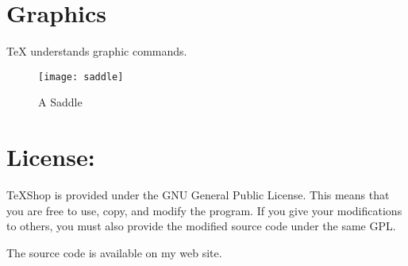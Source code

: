 \documentclass[11pt]{article}
\begin{document}
\section{Graphics}

TeX understands graphic commands.

\begin{figure}[htbp]
   \centering
   \texttt{[image: saddle]} 
   \caption{A Saddle}
\end{figure}

\section{License:}
TeXShop is provided under the GNU General Public License. This means that you are
free to use, copy, and modify the program. If you give your modifications to others,
you must also provide the modified source code under the same GPL.

The source code is available on my web site.



 
\end{document}
